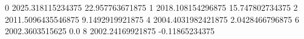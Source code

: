 0 2025.318115234375 22.957763671875
1 2018.108154296875 15.747802734375
2 2011.5096435546875 9.1492919921875
4 2004.4031982421875 2.0428466796875
6 2002.3603515625 0.0
8 2002.24169921875 -0.11865234375
